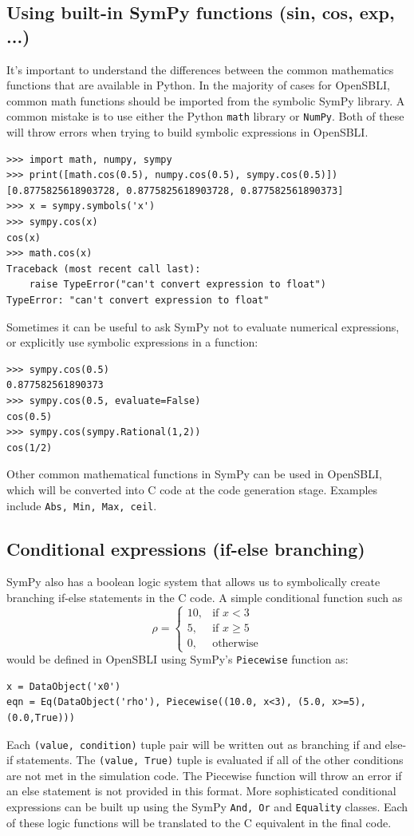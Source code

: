 \documentclass[11pt]{article}
\begin{document}
\subsection{Using built-in SymPy functions (sin, cos, exp, ...)}
It's important to understand the differences between the common mathematics functions that are available in Python. In the majority of cases for OpenSBLI, common math functions should be imported from the symbolic SymPy library. A common mistake is to use either the Python \verb|math| library or \verb|NumPy|. Both of these will throw errors when trying to build symbolic expressions in OpenSBLI.
\begin{lstlisting}
>>> import math, numpy, sympy
>>> print([math.cos(0.5), numpy.cos(0.5), sympy.cos(0.5)])
[0.8775825618903728, 0.8775825618903728, 0.877582561890373]
>>> x = sympy.symbols('x')
>>> sympy.cos(x)
cos(x)
>>> math.cos(x)
Traceback (most recent call last):
    raise TypeError("can't convert expression to float")
TypeError: "can't convert expression to float"
\end{lstlisting}
Sometimes it can be useful to ask SymPy not to evaluate numerical expressions, or explicitly use symbolic expressions in a function:
\begin{lstlisting}
>>> sympy.cos(0.5)
0.877582561890373
>>> sympy.cos(0.5, evaluate=False)
cos(0.5)
>>> sympy.cos(sympy.Rational(1,2))
cos(1/2)
\end{lstlisting}
Other common mathematical functions in SymPy can be used in OpenSBLI, which will be converted into C code at the code generation stage. Examples include \verb|Abs, Min, Max, ceil|.

\subsection{Conditional expressions (if-else branching)}\label{sec:piecewise}
SymPy also has a boolean logic system that allows us to symbolically create branching if-else statements in the C code. A simple conditional function such as
\[
    \rho= 
\begin{cases}
    10,& \text{if } x < 3\\
    5,& \text{if } x \geq 5\\
    0,              & \text{otherwise}
\end{cases}
\]
would be defined in OpenSBLI using SymPy's \verb|Piecewise| function as:
\begin{lstlisting}
x = DataObject('x0')
eqn = Eq(DataObject('rho'), Piecewise((10.0, x<3), (5.0, x>=5), (0.0,True)))
\end{lstlisting}
Each \verb|(value, condition)| tuple pair will be written out as branching if and else-if statements. The \verb|(value, True)| tuple is evaluated if all of the other conditions are not met in the simulation code. The Piecewise function will throw an error if an else statement is not provided in this format. More sophisticated conditional expressions can be built up using the SymPy \verb|And, Or| and \verb|Equality| classes. Each of these logic functions will be translated to the C equivalent in the final code.
\end{document}
